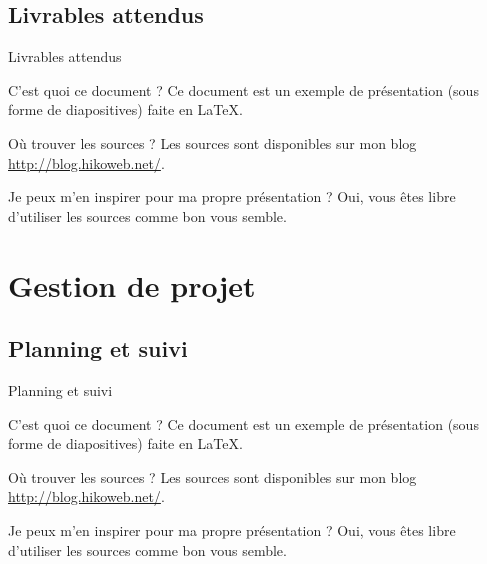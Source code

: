 \documentclass[utf8,compress]{beamer}
\begin{document}
\subsection{Livrables attendus}
\begin{frame}{Livrables attendus}
\begin{block}{C'est quoi ce document ?}
    Ce document est un exemple de présentation (sous forme de diapositives) faite en LaTeX.
\end{block}
\begin{block}{Où trouver les sources ?}
    Les sources sont disponibles sur mon blog \url{http://blog.hikoweb.net/}.
\end{block}
\begin{block}{Je peux m'en inspirer pour ma propre présentation ?}
    Oui, vous êtes libre d'utiliser les sources comme bon vous semble.
\end{block}
\end{frame}


\section{Gestion de projet}
\subsection{Planning et suivi}
\begin{frame}{Planning et suivi}
\begin{block}{C'est quoi ce document ?}
    Ce document est un exemple de présentation (sous forme de diapositives) faite en LaTeX.
\end{block}
\begin{block}{Où trouver les sources ?}
    Les sources sont disponibles sur mon blog \url{http://blog.hikoweb.net/}.
\end{block}
\begin{block}{Je peux m'en inspirer pour ma propre présentation ?}
    Oui, vous êtes libre d'utiliser les sources comme bon vous semble.
\end{block}
\end{frame}
\end{document}
